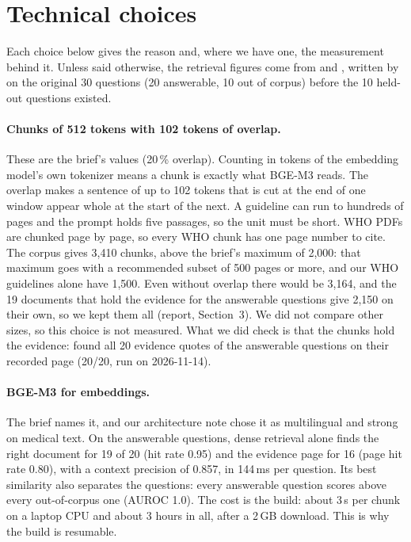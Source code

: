 \section{Technical choices}
\label{sec:choices}

Each choice below gives the reason and, where we have one, the measurement behind it. Unless said
otherwise, the retrieval figures come from  and
, written by  on the original 30
questions (20 answerable, 10 out of corpus) before the 10 held-out questions existed.

\paragraph{Chunks of 512 tokens with 102 tokens of overlap.}
These are the brief's values (20\,\% overlap). Counting in tokens of the embedding model's own
tokenizer means a chunk is exactly what BGE-M3 reads. The overlap makes a sentence of up to 102
tokens that is cut at the end of one window appear whole at the start of the next. A guideline can
run to hundreds of pages and the prompt holds five passages, so the unit must be short. WHO PDFs are chunked page by page, so
every WHO chunk has one page number to cite. The corpus gives 3,410 chunks, above the brief's maximum of 2,000: that maximum goes with a
recommended subset of 500 pages or more, and our WHO guidelines alone have 1,500. Even without
overlap there would be 3,164, and the 19 documents that hold the evidence for the answerable questions
give 2,150 on their own, so we kept them all (report, Section~3). We did not compare other sizes, so this choice is not
measured. What we did check is that the chunks hold the evidence: 
found all 20 evidence quotes of the answerable questions on their recorded page (20/20, run on
2026-11-14).

\paragraph{BGE-M3 for embeddings.}
The brief names it, and our architecture note chose it as multilingual and strong on medical
text. On the answerable questions,
dense retrieval alone finds the right document for 19 of 20 (hit rate 0.95) and the evidence page
for 16 (page hit rate 0.80), with a context precision of 0.857, in 144\,ms per question. Its best
similarity also separates the questions: every answerable question scores above every out-of-corpus
one (AUROC 1.0). The cost is the build: about 3\,s per chunk on a laptop CPU and about 3 hours in
all, after a 2\,GB download. This is why the build is resumable.

